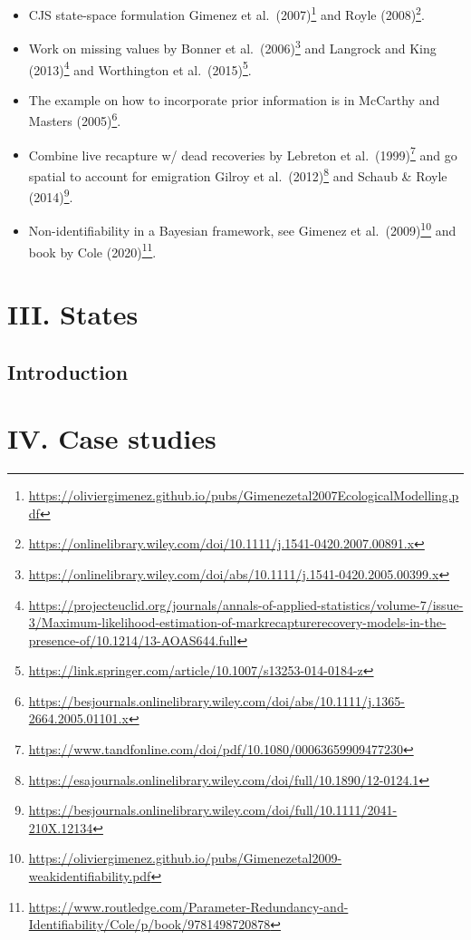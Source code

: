 \documentclass[
  12pt,
]{krantz}
\renewcommand{\href}[2]{#2\footnote{\url{#1}}}
\begin{document}
\begin{itemize}
\item
  CJS state-space formulation \href{https://oliviergimenez.github.io/pubs/Gimenezetal2007EcologicalModelling.pdf}{Gimenez et al.~(2007)} and \href{https://onlinelibrary.wiley.com/doi/10.1111/j.1541-0420.2007.00891.x}{Royle (2008)}.
\item
  Work on missing values by \href{https://onlinelibrary.wiley.com/doi/abs/10.1111/j.1541-0420.2005.00399.x}{Bonner et al.~(2006)} and \href{https://projecteuclid.org/journals/annals-of-applied-statistics/volume-7/issue-3/Maximum-likelihood-estimation-of-markrecapturerecovery-models-in-the-presence-of/10.1214/13-AOAS644.full}{Langrock and King (2013)} and \href{https://link.springer.com/article/10.1007/s13253-014-0184-z}{Worthington et al.~(2015)}.
\item
  The example on how to incorporate prior information is in \href{https://besjournals.onlinelibrary.wiley.com/doi/abs/10.1111/j.1365-2664.2005.01101.x}{McCarthy and Masters (2005)}.
\item
  Combine live recapture w/ dead recoveries by \href{https://www.tandfonline.com/doi/pdf/10.1080/00063659909477230}{Lebreton et al.~(1999)} and go spatial to account for emigration \href{https://esajournals.onlinelibrary.wiley.com/doi/full/10.1890/12-0124.1}{Gilroy et al.~(2012)} and \href{https://besjournals.onlinelibrary.wiley.com/doi/full/10.1111/2041-210X.12134}{Schaub \& Royle (2014)}.
\item
  Non-identifiability in a Bayesian framework, see \href{https://oliviergimenez.github.io/pubs/Gimenezetal2009-weakidentifiability.pdf}{Gimenez et al.~(2009)} and \href{https://www.routledge.com/Parameter-Redundancy-and-Identifiability/Cole/p/book/9781498720878}{book by Cole (2020)}.
\end{itemize}

\hypertarget{part-iii.-states}{%
\part{III. States}\label{part-iii.-states}}

\hypertarget{introduction-6}{%
\chapter*{Introduction}\label{introduction-6}}


\hypertarget{part-iv.-case-studies}{%
\part{IV. Case studies}\label{part-iv.-case-studies}}
\end{document}
